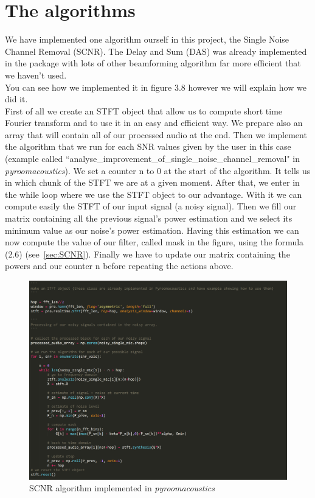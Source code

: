 \documentclass[11pt,a4paper,titlepage]{report}
\begin{document}
\section{The algorithms}
\hspace*{0.6cm}
We have implemented one algorithm ourself in this project, the Single Noise Channel Removal (SCNR). The Delay and Sum (DAS) was already implemented in the package with lots of other beamforming algorithm far more efficient that we haven't used.\\
You can see how we implemented it in figure 3.8 however we will explain how we did it.\\
First of all we create an STFT object that allow us to compute short time Fourier transform and to use it in an easy and efficient way. We prepare also an array that will contain all of our processed audio at the end.
Then we implement the algorithm that we run for each SNR values given by the user in this case (example called ``analyse\_improvement\_of\_single\_noise\_channel\_removal" in \textit{pyroomacoustics}). We set a counter n to 0 at the start of the algorithm. It tells us in which chunk of the STFT we are at a given moment. After that, we enter in the while loop where we use the STFT object to our advantage. With it we can compute easily the STFT of our input signal (a noisy signal). Then we fill our matrix containing all the previous signal's power estimation and we select its minimum value as our noise's power estimation. Having this estimation we can now compute the value of our filter, called mask in the figure, using the formula (2.6) (see~\ref{sec:SCNR}). Finally we have to update our matrix containing the powers and our counter n before repeating the actions above.\
\begin{figure}[h!]
	\centering
	\includegraphics[width=0.7\linewidth]{rapport11}
	\caption{SCNR algorithm implemented in \textit{pyroomacoustics}}
	\label{fig:rapport14}
\end{figure}\\
\end{document}
